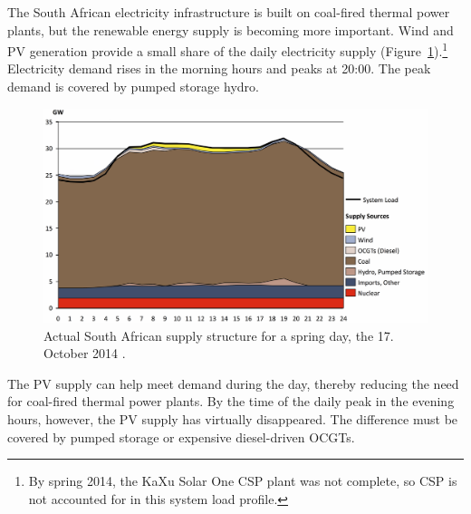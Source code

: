 The South African electricity infrastructure is built on coal-fired thermal power plants, but the renewable energy supply is becoming more important. Wind and \ac{PV} generation provide a small share of the daily electricity supply (Figure~\ref{systemload}).\footnote{By spring 2014, the KaXu Solar One CSP plant was not complete, so CSP is not accounted for in this system load profile.} Electricity demand rises in the morning hours and peaks at 20:00. The peak demand is covered by pumped storage hydro. 

\begin{figure}[htbp]  
\centering
\includegraphics[width=1\linewidth]{FIG/systemload}
\caption[Actual South African supply structure for a spring day, the 17. October 2014.]{Actual South African supply structure for a spring day, the 17. October 2014 \cite{CSIR2015}.}\label{systemload}
\end{figure}

The \ac{PV} supply can help meet demand during the day, thereby reducing the need for coal-fired thermal power plants. By the time of the daily peak in the evening hours, however, the \ac{PV} supply has virtually disappeared. The difference must be covered by pumped storage or expensive diesel-driven \acp{OCGT}.


